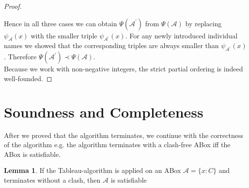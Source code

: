 \documentclass{book}
\theoremstyle{break}
\theoremstyle{definition}
\newtheorem{mylem}{Lemma}
\begin{document}
\begin{proof}
\begin{itemize}
\end{itemize}
 Hence in all three cases we can obtain $\Psi(\mathcal{A}^\prime)$ from $\Psi(\mathcal{A})$ by replacing $\psi_\mathcal{A}(x)$ with the smaller triple $\psi_{\mathcal{A}^\prime}(x)$. For any newly introduced individual names we showed that the corresponding triples are always smaller than $\psi_{\mathcal{A}^\prime}(x)$. Therefore $\Psi(\mathcal{A}^\prime)\prec\Psi(\mathcal{A})$. \\
Because we work with non-negative integers, the strict partial ordering is indeed well-founded.
\end{proof}
\section{Soundness and Completeness}
After we proved that the algorithm terminates, we continue with the correctness of the algorithm e.g. the algorithm terminates with a clash-free ABox iff the ABox is satisfiable.
\begin{mylem}
If the Tableau-algorithm is applied on an ABox $\mathcal{A}=\{x:C\}$ and  terminates without a clash, then $\mathcal{A}$ is satisfiable
\end{mylem}
\end{document}
